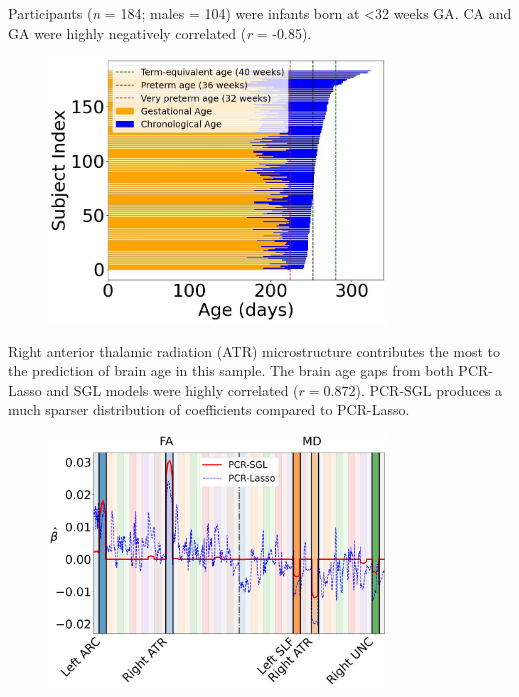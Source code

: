 \documentclass[final]{beamer}
\newlength{\colwidth}
\begin{document}
\begin{frame}[t]
\begin{columns}[t]
\begin{column}{\colwidth}
  \vspace{-15pt}
  \begin{block}{Participants (\textit{n} = 184; males = 104) were infants born at \textless 32 weeks GA. CA and GA were highly negatively correlated (\textit{r} = -0.85).}
    \vspace{-5pt}
    \begin{figure}[ht]
      \centering
      \includegraphics[clip, width=0.8\textwidth]{age_at_scan.jpg}
      \label{fig:age_at_scan}
    \end{figure}
  \end{block}
  \vspace{-20pt}
  
  \begin{block}{Right anterior thalamic radiation (ATR) microstructure contributes the most to the prediction of brain age in this sample.}
    The brain age gaps from both PCR-Lasso and SGL models were highly correlated ($\textit{r} = 0.872$). PCR-SGL produces a much sparser distribution of coefficients compared to PCR-Lasso.

    \vspace{-10pt}
    
    \begin{figure}
      \centering
      \includegraphics[clip, width=0.8\textwidth]{sgl_both.jpg}
    \end{figure}
    \vspace{-20pt}  %


\end{block}
\end{column}
\end{columns}
\end{frame}
\end{document}
